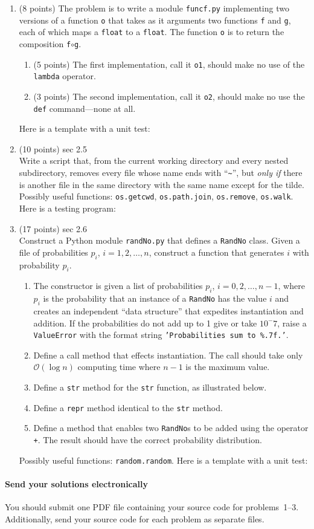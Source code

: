 \documentclass[11pt]{article}
\begin{document}
\begin{enumerate}

\item (8 points)  %
 The problem is to write a module {\tt funcf.py}
 implementing two versions of a function {\tt o}
 that takes as it arguments two
 functions {\tt f} and {\tt g}, each of which maps a {\tt float}
 to a {\tt float}.
 The function {\tt o} is to return the composition {\tt f}$\circ${\tt g}.
 \begin{enumerate}
 \item (5 points)
 The first implementation, call it {\tt o1},
 should make no use of the {\tt lambda} operator.
 \item (3 points)
   The second implementation, call it {\tt o2},
   should make no use the {\tt def} command---none at all.
 \end{enumerate}
 Here is a template with a unit test:
 


\item (10 points)  sec 2.5  \\ %
 Write a script that,
 from the current working directory and every nested subdirectory,
 removes every file whose name ends with ``\verb|~|'',
 but {\em only if} there is another file in the same directory
 with the same name except for the tilde.
Possibly useful functions: {\tt os.getcwd}, {\tt os.path.join},
 {\tt os.remove}, {\tt os.walk}.
 Here is a testing program:
 

\item (17 points)  sec 2.6 \\
 Construct a Python module {\tt randNo.py} that defines a {\tt RandNo} class.
 Given a file of probabilities $p_i$, $i = 1, 2,\ldots, n$,
 construct a function that generates $i$ with probability $p_i$.
 \begin{enumerate}
 \item The constructor is given a list of probabilities
  $p_i$, $i = 0, 2,\ldots, n-1$, where $p_i$ is the probability that
  an instance of a {\tt RandNo} has the value $i$
  and creates an independent ``data structure''
  that expedites instantiation and addition.
  If the probabilities do not add up to 1 give or take $10^-7$,
  raise a {\tt ValueError} with the format string
  {\tt 'Probabilities sum to \%.7f.'}.
 \item Define a call method that effects instantiation.
  The call should take only $\mathcal{O}(\log n)$ computing time
  where $n-1$ is the maximum value.
 \item Define a {\tt str} method for the {\tt str} function,
  as illustrated below.
 \item Define a {\tt repr} method identical to the {\tt str} method.
 \item Define a method that enables two {\tt RandNo}s to be added
  using the operator {\tt +}.
  The result should have the correct probability distribution.
 \end{enumerate}
Possibly useful functions:  {\tt random.random}.
 Here is a template with a unit test:
 

\end{enumerate}

\paragraph{Send your solutions electronically}
You should submit one PDF file containing your source code for problems~1--3.
Additionally,
send your source code for each problem as separate files.
\end{document}
